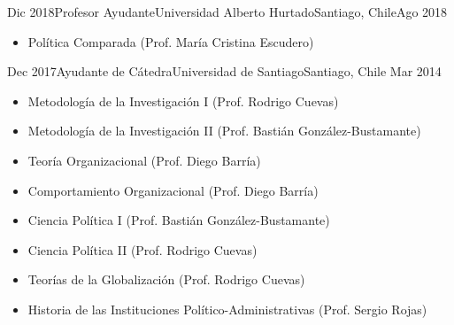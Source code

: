 





\begin{experiences}
  \experience
    {Dic 2018}{Profesor Ayudante}{Universidad Alberto Hurtado}{Santiago, Chile}{Ago 2018}
    {\begin{itemize}
    \item Política Comparada {\small (Prof. María Cristina Escudero)}
    \end{itemize}}
    {}
\end{experiences}
\vspace{-2mm}

\begin{experiences}
  \emptySeparator 
  \experience 
    {Dec 2017}{Ayudante de Cátedra}{Universidad de Santiago}{Santiago, Chile} {Mar 2014}
    {\begin{itemize}
    \item Metodología de la Investigación I {\small (Prof. Rodrigo Cuevas)}
    \item Metodología de la Investigación II {\small (Prof. Bastián González-Bustamante)}
    \item Teoría Organizacional {\small (Prof. Diego Barría)}
    \item Comportamiento Organizacional {\small (Prof. Diego Barría)}
    \item Ciencia Política I {\small (Prof. Bastián González-Bustamante)}
    \item Ciencia Política II {\small (Prof. Rodrigo Cuevas)}
	\item Teorías de la Globalización {\small (Prof. Rodrigo Cuevas)}
	\item Historia de las Instituciones Político-Administrativas {\small (Prof. Sergio Rojas)}
    \end{itemize}}
    {}
\end{experiences}
\vspace{-2mm}

